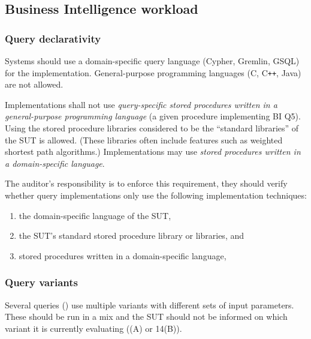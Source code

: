 \subsection{Business Intelligence workload}
\label{sec:bi-workload-audit}

\subsubsection{Query declarativity}

Systems should use a domain-specific query language (\eg Cypher, Gremlin, GSQL) for the implementation.
General-purpose programming languages (\eg C, C\texttt{++}, Java) are not allowed.

Implementations shall not use \emph{query-specific stored procedures written in a general-purpose programming language} (\eg a given procedure implementing BI Q5). Using the stored procedure libraries considered to be the ``standard libraries'' of the SUT is allowed. (These libraries often include features such as weighted shortest path algorithms.) Implementations may use \emph{stored procedures written in a domain-specific language}.

The auditor's responsibility is to enforce this requirement, \ie they should verify whether query implementations only use the following implementation techniques:
\begin{enumerate}
    \item the domain-specific language of the SUT,
    \item the SUT's standard stored procedure library or libraries, and
    \item stored procedures written in a domain-specific language,
\end{enumerate}

\subsubsection{Query variants}

Several queries (\eg {}) use multiple variants with different sets of input parameters.
These should be run in a mix and the SUT should not be informed on which variant it is currently evaluating ((A) or 14(B)).
